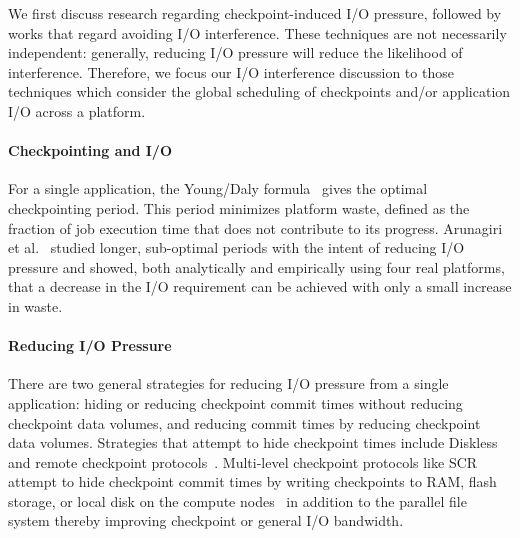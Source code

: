 \documentclass[conference,nofonttune]{IEEEtran}
\begin{document}
We first discuss research regarding checkpoint-induced I/O pressure, followed by
works that regard avoiding I/O interference.  These techniques are not necessarily
independent: generally, reducing I/O pressure will reduce the likelihood of
interference.  Therefore, we focus our I/O interference discussion to those
techniques which consider the global scheduling of checkpoints and/or application I/O
across a platform.


\paragraph*{Checkpointing and I/O}

For a single application, the Young/Daly formula~\cite{young74,daly04} gives the
optimal checkpointing period. This period minimizes platform waste, defined as the
fraction of job execution time that does not contribute to its progress.
Arunagiri et
al.~\cite{Arunagiri2010} studied longer, sub-optimal periods with the intent of
reducing I/O pressure and showed, both analytically and empirically using four real
platforms, that a decrease in the I/O requirement can be achieved with only a small
increase in waste.

\paragraph*{Reducing I/O Pressure}

There are two general strategies for reducing I/O pressure from a single application:
hiding or reducing checkpoint commit times without reducing checkpoint data volumes,
and reducing commit times by reducing checkpoint data volumes.  Strategies that
attempt to hide checkpoint times include Diskless~\cite{Plank98Diskless} and remote
checkpoint protocols~\cite{Cornwell11RemoteBLCR}.
Multi-level
checkpoint protocols like SCR~\cite{Moody10SCR,Vaidya95TwoLevel} attempt to hide
checkpoint commit times by writing checkpoints to RAM, flash storage, or local disk
on the compute nodes~\cite{Kougkas2017} in addition to the parallel file system
thereby improving checkpoint or general I/O bandwidth.
\end{document}
